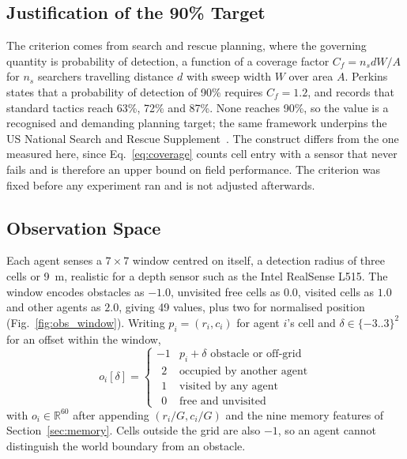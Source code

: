 \documentclass[a4paper, 10pt, conference]{ieeeconf}
\begin{document}
\subsection{Justification of the 90\% Target}\label{sec:threshold}

The criterion comes from search and rescue planning, where the
governing quantity is probability of detection, a function of a
coverage factor $C_{f} = n_{s}dW/A$ for $n_s$ searchers travelling
distance $d$ with sweep width $W$ over area $A$.
Perkins~\cite{perkins2013} states that a probability of detection of
90\% requires $C_f = 1.2$, and records that standard tactics reach
63\%, 72\% and 87\%. None reaches 90\%, so the value is a recognised
and demanding planning target; the same framework underpins the US
National Search and Rescue Supplement~\cite{nss2018}. The construct
differs from the one measured here, since Eq.~\ref{eq:coverage} counts
cell entry with a sensor that never fails and is therefore an upper
bound on field performance. The criterion was fixed before any
experiment ran and is not adjusted afterwards.

\subsection{Observation Space}\label{sec:obs}

Each agent senses a $7\times7$ window centred on itself, a detection
radius of three cells or 9~m, realistic for a depth sensor such as the
Intel RealSense L515. The window encodes obstacles as $-1.0$,
unvisited free cells as $0.0$, visited cells as $1.0$ and other agents
as $2.0$, giving 49 values, plus two for normalised position
(Fig.~\ref{fig:obs_window}). Writing $p_i=(r_i,c_i)$ for agent $i$'s
cell and $\delta\in\{-3..3\}^2$ for an offset within the window,
\begin{equation}\label{eq:obs}
o_i[\delta]=
\begin{cases}
-1 & p_i{+}\delta \text{ obstacle or off-grid}\\
\;\,2 & \text{occupied by another agent}\\
\;\,1 & \text{visited by any agent}\\
\;\,0 & \text{free and unvisited}
\end{cases}
\end{equation}
with $o_i \in \mathbb{R}^{60}$ after appending
$(r_i/G, c_i/G)$ and the nine memory features of
Section~\ref{sec:memory}. Cells outside the grid are also $-1$, so an
agent cannot distinguish the world boundary from an obstacle.
\end{document}
